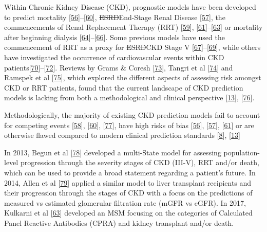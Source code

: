 \documentclass[12pt,PhD,twoside,openright]{muthesis}
\begin{document}
Within Chronic Kidney Disease (CKD), prognostic models have been developed to predict mortality {[}\protect\hyperlink{ref-johnson_predicting_2007}{56}{]}--{[}\protect\hyperlink{ref-wick_clinical_2017}{60}{]}, \sout{ESRD}End-Stage Renal Disease {[}\protect\hyperlink{ref-landray_prediction_2010}{57}{]}, the commencements of Renal Replacement Therapy (RRT) {[}\protect\hyperlink{ref-marks_looking_2015}{59}{]}, {[}\protect\hyperlink{ref-johnson_predicting_2008}{61}{]}--{[}\protect\hyperlink{ref-kulkarni_transition_2017}{63}{]} or mortality after beginning dialysis {[}\protect\hyperlink{ref-floege_development_2015}{64}{]}--{[}\protect\hyperlink{ref-cao_predicting_2015}{66}{]}. Some previous models have used the commencement of RRT as a proxy for \sout{ESRD}CKD Stage V {[}\protect\hyperlink{ref-tangri_predictive_2011}{67}{]}--{[}\protect\hyperlink{ref-tangri_dynamic_2017}{69}{]}, while others have investigated the occurrence of cardiovascular events within CKD patients{[}\protect\hyperlink{ref-shlipak_cardiovascular_2005}{70}{]}--{[}\protect\hyperlink{ref-mcmurray_predictors_2011}{72}{]}. Reviews by Grams \& Coresh {[}\protect\hyperlink{ref-grams_assessing_2013}{73}{]}, Tangri et al {[}\protect\hyperlink{ref-tangri_risk_2013}{74}{]} and Ramspek et al {[}\protect\hyperlink{ref-ramspek_prediction_2017}{75}{]}, which explored the different aspects of assessing risk amongst CKD or RRT patients, found that the current landscape of CKD prediction models is lacking from both a methodological and clinical perspective {[}\protect\hyperlink{ref-collins_transparent_2015}{13}{]}, {[}\protect\hyperlink{ref-bouwmeester_reporting_2012-1}{76}{]}.

Methodologically, the majority of existing CKD prediction models fail to account for competing events {[}\protect\hyperlink{ref-bansal_development_2015}{58}{]}, {[}\protect\hyperlink{ref-wick_clinical_2017}{60}{]}, {[}\protect\hyperlink{ref-perotte_risk_2015}{77}{]}, have high risks of bias {[}\protect\hyperlink{ref-johnson_predicting_2007}{56}{]}, {[}\protect\hyperlink{ref-landray_prediction_2010}{57}{]}, {[}\protect\hyperlink{ref-johnson_predicting_2008}{61}{]} or are otherwise flawed compared to modern clinical prediction standards {[}\protect\hyperlink{ref-steyerberg_prognosis_2013}{8}{]}, {[}\protect\hyperlink{ref-collins_transparent_2015}{13}{]}

In 2013, Begun et al {[}\protect\hyperlink{ref-begun_identification_2013}{78}{]} developed a multi-State model for assessing population-level progression through the severity stages of CKD (III-V), RRT and/or death, which can be used to provide a broad statement regarding a patient's future. In 2014, Allen et al {[}\protect\hyperlink{ref-allen_chronic_2014}{79}{]} applied a similar model to liver transplant recipients and their progression through the stages of CKD with a focus on the predictions of measured vs estimated glomerular filtration rate (mGFR vs eGFR). In 2017, Kulkarni et al {[}\protect\hyperlink{ref-kulkarni_transition_2017}{63}{]} developed an MSM focusing on the categories of Calculated Panel Reactive Antibodies \sout{(CPRA)} and kidney transplant and/or death.
\end{document}
